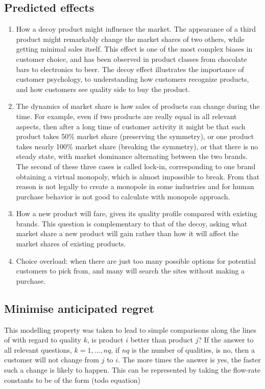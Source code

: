 \subsection{Predicted effects} \label{subsec:predicted}
\begin{enumerate}
	\item How a decoy product might influence the market.
	The appearance of a third product might remarkably change the market shares of two others, while getting minimal sales itself.
	This effect is one of the most complex biases in customer choice, and has been observed in product classes from chocolate bars
	to electronics to beer.
	The decoy effect illustrates the importance of customer psychology, to understanding how customers recognize products,
	and how customers see quality side to buy the product.

	\item The dynamics of market share is  how sales of products can change during the time.
	For example, even if two products are really equal in all relevant aspects, then after a long time of customer activity it might be that
	each product takes 50\% market share (preserving the symmetry), or one product takes nearly 100\% market share (breaking the symmetry),
	or that there is no steady state, with market dominance alternating between the two brands.
	The second of these three cases is called lock-in, corresponding to one brand obtaining a virtual monopoly,
	which is almost impossible to break.
	From that reason is not legally to create a monopole in some industries and for human purchase behavior is not
	good to calculate with monopole approach.

	\item How a new product will fare, given its quality profile compared with existing brands.
	This question is complementary to that of the decoy, asking what market share a new product will gain rather than how it will
	affect the market shares of existing products.

	\item Choice overload: when there are just too many possible options for potential customers to pick from, and many
	will search the sites without making a purchase.
\end{enumerate}

\subsection{Minimise anticipated regret} \label{subsec:regret}
This modelling property was taken to lead to simple comparisons along the lines of with regard to quality $k$,
is product $i$ better than product $j$?
If the answer to all relevant questions, $k = 1, . . . , nq$, if $nq$ is the number of qualities, is no, then a customer
will not change from $j$ to $i$.
The more times the answer is yes, the faster such a change is likely to happen.
This can be represented by taking the flow-rate constants to be of the form (todo equation)

